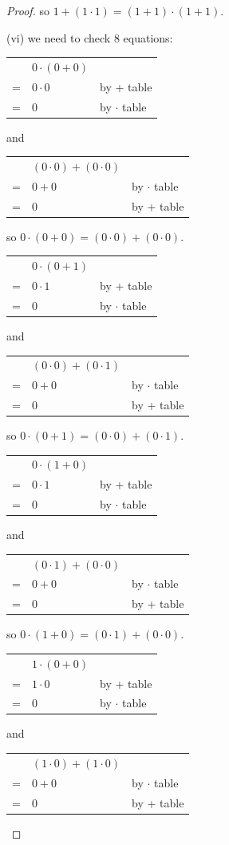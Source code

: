 \documentclass[14pt]{extarticle}
\newcommand{\cy}{\color{cyan}}
\begin{document}
\begin{proof}
so \(1 + (1 \cdot 1) = (1 + 1) \cdot (1 + 1)\).

(vi) we need to check 8 equations:

\begin{tabular}{cll}
  & \(0 \cdot (0 + 0)\) & \\
= & \(0 \cdot 0\) & {\cy by + table} \\
= & \(0\) & {\cy by $\cdot$ table}
\end{tabular}
and
\begin{tabular}{cll}
  & \((0 \cdot 0) + (0 \cdot 0)\) & \\
= & \(0 + 0\) & {\cy by $\cdot$ table} \\
= & \(0\) & {\cy by + table}
\end{tabular}

so \(0 \cdot (0 + 0) = (0 \cdot 0) + (0 \cdot 0)\).

\begin{tabular}{cll}
  & \(0 \cdot (0 + 1)\) & \\
= & \(0 \cdot 1\) & {\cy by + table} \\
= & \(0\) & {\cy by $\cdot$ table}
\end{tabular}
and
\begin{tabular}{cll}
  & \((0 \cdot 0) + (0 \cdot 1)\) & \\
= & \(0 + 0\) & {\cy by $\cdot$ table} \\
= & \(0\) & {\cy by + table}
\end{tabular}

so \(0 \cdot (0 + 1) = (0 \cdot 0) + (0 \cdot 1)\).

\begin{tabular}{cll}
  & \(0 \cdot (1 + 0)\) & \\
= & \(0 \cdot 1\) & {\cy by + table} \\
= & \(0\) & {\cy by $\cdot$ table}
\end{tabular}
and
\begin{tabular}{cll}
  & \((0 \cdot 1) + (0 \cdot 0)\) & \\
= & \(0 + 0\) & {\cy by $\cdot$ table} \\
= & \(0\) & {\cy by + table}
\end{tabular}

so \(0 \cdot (1 + 0) = (0 \cdot 1) + (0 \cdot 0)\).

\begin{tabular}{cll}
  & \(1 \cdot (0 + 0)\) & \\
= & \(1 \cdot 0\) & {\cy by + table} \\
= & \(0\) & {\cy by $\cdot$ table}
\end{tabular}
and
\begin{tabular}{cll}
  & \((1 \cdot 0) + (1 \cdot 0)\) & \\
= & \(0 + 0\) & {\cy by $\cdot$ table} \\
= & \(0\) & {\cy by + table}
\end{tabular}


\end{proof}
\end{document}
